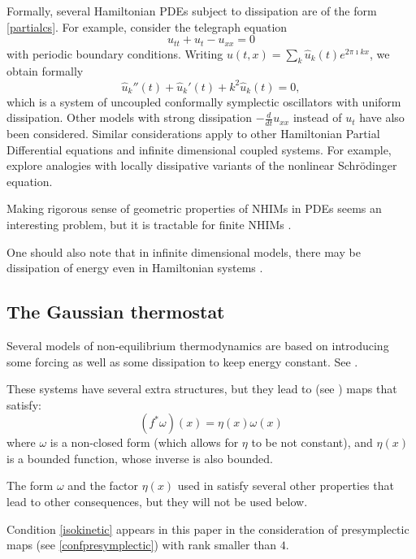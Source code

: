 \documentclass[11pt]{amsart}
\theoremstyle{definition}
\theoremstyle{remark}
\numberwithin{equation}{section}
\begin{document}
Formally,  several Hamiltonian PDEs
subject to dissipation are of the form \eqref{partialcs}.
For example, consider  the telegraph equation
\[
u_{tt} + u_t - u_{xx} = 0
\]
with periodic boundary conditions.
Writing  $u(t,x) = \sum_k \hat u_k(t) e^{2 \pi \imath k x} $,
we obtain formally
\[
\hat u_k''(t) + \hat u_k'(t) + k^2 \hat u_k (t) = 0,
\]
which is a system of uncoupled
conformally symplectic oscillators with uniform dissipation.
Other models with strong dissipation $-\frac{d}{dt}u_{xx}$ instead of
$u_t $ have also been considered.
Similar considerations apply to other Hamiltonian Partial Differential equations
and   infinite dimensional coupled systems.
For example, \cite{EckmannW20, EckmanW18, CuneoEW17} explore analogies with locally dissipative variants of the nonlinear Schr\"odinger  equation.

Making rigorous sense of geometric properties of NHIMs in PDEs
seems an interesting problem, but it is tractable for finite NHIMs \cite{BatesLZ08}.


One should also note that in infinite dimensional models, there may be dissipation of energy
even in Hamiltonian systems \cite{CorsiG22,ComechKK23}.




\subsection{The Gaussian thermostat}
\label{thermostat}
Several models of non-equilibrium thermodynamics
are based on introducing some forcing as well as some dissipation to
keep energy constant. See \cite{wojtkowski1998conformally}.

These systems have several extra structures,
but they lead to (see \cite[equation (2.4)]{wojtkowski1998conformally})
maps that satisfy:
\begin{equation}\label{isokinetic}
  (f^* \omega)(x) = \eta(x) \omega( x)
\end{equation}
where $\omega$ is a non-closed form (which  allows for $\eta$ to be
not constant), and $\eta(x)$ is a bounded function,
whose inverse is also bounded.

The form $\omega$ and  the factor $\eta(x)$
used in \cite{wojtkowski1998conformally}
satisfy several other properties that lead to other
consequences, but they will not be used below.

Condition \eqref{isokinetic} appears in this paper
in the consideration of presymplectic maps  (see \eqref{confpresymplectic}) with rank smaller than $4$.
\end{document}
